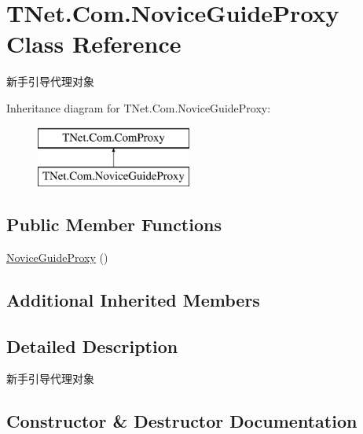 \hypertarget{class_t_net_1_1_com_1_1_novice_guide_proxy}{}\section{T\+Net.\+Com.\+Novice\+Guide\+Proxy Class Reference}
\label{class_t_net_1_1_com_1_1_novice_guide_proxy}


新手引导代理对象  


Inheritance diagram for T\+Net.\+Com.\+Novice\+Guide\+Proxy\+:\begin{figure}[H]
\begin{center}
\leavevmode
\includegraphics[height=2.000000cm]{class_t_net_1_1_com_1_1_novice_guide_proxy}
\end{center}
\end{figure}
\subsection*{Public Member Functions}
\begin{DoxyCompactItemize}
\item 
\mbox{\hyperlink{class_t_net_1_1_com_1_1_novice_guide_proxy_a76f0785cec190a36000287b82f5fca8b}{Novice\+Guide\+Proxy}} ()
\end{DoxyCompactItemize}
\subsection*{Additional Inherited Members}


\subsection{Detailed Description}
新手引导代理对象 



\subsection{Constructor \& Destructor Documentation}
\mbox{\label{class_t_net_1_1_com_1_1_novice_guide_proxy_a76f0785cec190a36000287b82f5fca8b}} 
